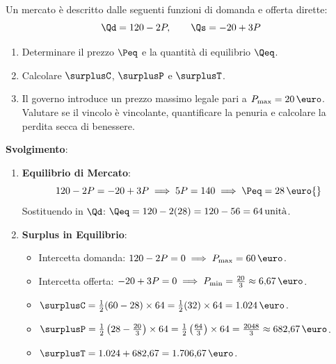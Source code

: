 \begin{esercizio}
Un mercato è descritto dalle seguenti funzioni di domanda e offerta dirette:
\begin{equation}
    \Qd = 120 - 2P, \qquad \Qs = -20 + 3P
\end{equation}
\begin{enumerate}
    \item Determinare il prezzo $\Peq$ e la quantità di equilibrio $\Qeq$.
    \item Calcolare $\surplusC$, $\surplusP$ e $\surplusT$.
    \item Il governo introduce un prezzo massimo legale pari a $P_{\max} = 20\,\text{\euro}$. Valutare se il vincolo è vincolante, quantificare la penuria e calcolare la perdita secca di benessere.
\end{enumerate}

\textbf{Svolgimento}:
\begin{enumerate}
    \item \textbf{Equilibrio di Mercato}:
    \begin{equation}
        120 - 2P = -20 + 3P \implies 5P = 140 \implies \Peq = 28\,\text{\euro{}}
    \end{equation}
    Sostituendo in $\Qd$: $\Qeq = 120 - 2(28) = 120 - 56 = 64\,\text{unità}$.
    
    \item \textbf{Surplus in Equilibrio}:
    \begin{itemize}
        \item Intercetta domanda: $120 - 2P = 0 \implies P_{\max} = 60\,\text{\euro}$.
        \item Intercetta offerta: $-20 + 3P = 0 \implies P_{\min} = \frac{20}{3} \approx 6{,}67\,\text{\euro}$.
        \item $\surplusC = \frac{1}{2} (60 - 28) \times 64 = \frac{1}{2} (32) \times 64 = 1.024\,\text{\euro}$.
        \item $\surplusP = \frac{1}{2} \left( 28 - \frac{20}{3} \right) \times 64 = \frac{1}{2} \left( \frac{64}{3} \right) \times 64 = \frac{2048}{3} \approx 682{,}67\,\text{\euro}$.
        \item $\surplusT = 1.024 + 682{,}67 = 1.706{,}67\,\text{\euro}$.
    \end{itemize}
    

\end{enumerate}
\end{esercizio}
